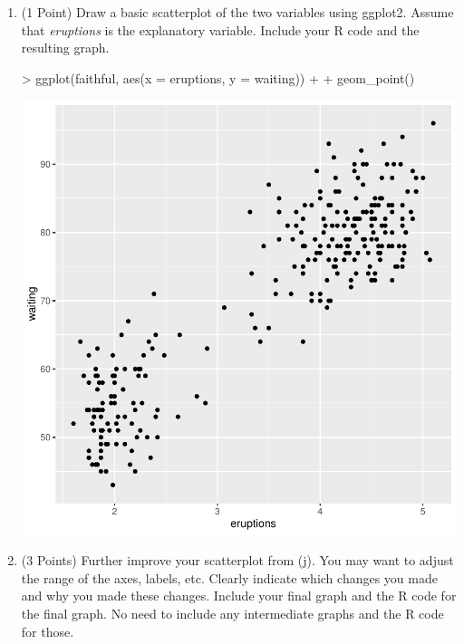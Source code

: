 \documentclass[12pt,letterpaper,final]{article}
\begin{document}
\begin{enumerate}
\begin{enumerate}
\item (1 Point) Draw a basic scatterplot of the two variables using ggplot2. Assume that {\it eruptions}
is the explanatory variable.
Include your R code and the resulting graph.

\begin{Schunk}
\begin{Sinput}
> ggplot(faithful, aes(x = eruptions, y = waiting)) +
+   geom_point()
\end{Sinput}
\end{Schunk}
\includegraphics{rnw_example-010}





\item (3 Points) Further improve your scatterplot from (j). 
You may want to adjust the range of the axes, labels, etc. 
Clearly indicate which changes
you made and why you made these changes. Include your final graph and the R code
for the final graph. No need to include any intermediate graphs and the R code for those.


\end{enumerate}
\end{enumerate}
\end{document}
